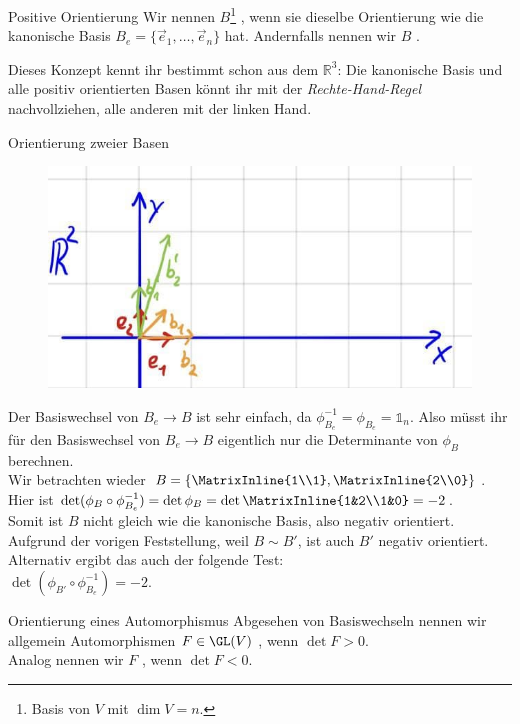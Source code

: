 \begin{Def}
{Positive Orientierung}
Wir nennen $B$\footnote{Basis von $V$ mit $\dim V=n$.} , wenn sie dieselbe Orientierung wie die kanonische Basis $B_e=\{\Vec{e}_1,\ldots,\Vec{e}_n\}$ hat. Andernfalls nennen wir $B$ .
\end{Def}
Dieses Konzept kennt ihr bestimmt schon aus dem $\mathbb{R}^3$: Die kanonische Basis und alle positiv orientierten Basen könnt ihr mit der \textit{Rechte-Hand-Regel} nachvollziehen, alle anderen mit der linken Hand.
\begin{Beispiel}{Orientierung zweier Basen}
\begin{figure}
 \vspace{-15pt}
\includegraphics[width=.35\textwidth]{Dateien/01/01Basiswechsel.jpg}
 \vspace{-15pt}
\end{figure}
Der Basiswechsel von $B_e\to B$ ist sehr einfach, da $\phi_{B_e}^{-1}=\phi_{B_e}=\mathds{1}_n$. Also müsst ihr für den Basiswechsel von $B_e\to B$  eigentlich nur die Determinante von $\phi_B$ berechnen.\\
Wir betrachten wieder $B=\left\{\MatrixInline{1\\1},\MatrixInline{2\\0}\right\}$.\\
Hier ist $\det(\phi_B\circ\phi_{B_e}^{-1})=\det\phi_B=\det\MatrixInline{1&2\\1&0}=-2$.\\
Somit ist $B$ nicht gleich wie die kanonische Basis, also negativ orientiert.\\
Aufgrund der vorigen Feststellung, weil $B\sim B'$, ist auch $B'$ negativ orientiert. Alternativ ergibt das auch der folgende Test:\\ $\det(\phi_{B'}\circ\phi_{B_e}^{-1})=-2$.
\end{Beispiel}

\begin{Def}{Orientierung eines Automorphismus}
Abgesehen von Basiswechseln nennen wir allgemein Automorphismen $F\in \GL(V)$ , wenn $\det F>0$.\\
Analog nennen wir $F$ , wenn $\det F<0$.
\end{Def}

